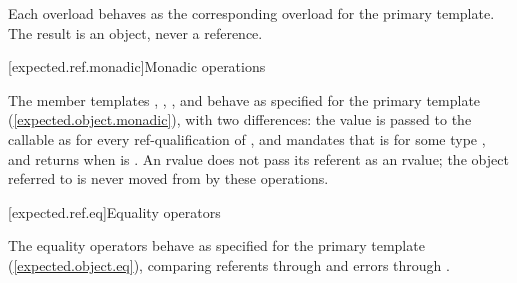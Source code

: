 \begin{addedblock}
\begin{itemdescr}
\pnum
\returns
Each overload behaves as the corresponding overload for the primary template.
The result is an object, never a reference.
\end{itemdescr}

[expected.ref.monadic]{Monadic operations}

\pnum
The member templates , , , and
 behave as specified for the primary template
(\ref{expected.object.monadic}), with two differences: the value is passed to
the callable as  for every ref-qualification of , and
 mandates that  is  for some
type , and returns  when
 is . An rvalue  does
not pass its referent as an rvalue; the object referred to is never moved from
by these operations.

[expected.ref.eq]{Equality operators}

\pnum
The equality operators behave as specified for the primary template
(\ref{expected.object.eq}), comparing referents through  and
errors through .
\end{addedblock}

